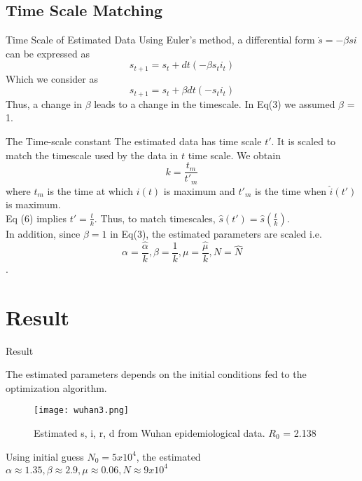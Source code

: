 \documentclass{beamer}
\begin{document}
\subsection{Time Scale Matching}
\begin{frame}{Time Scale of Estimated Data}
Using Euler’s method, a differential form $\dot{s}=-\beta si$ can be expressed as
	$$s_{t+1} = s_t + dt (-\beta s_t i_t)$$
Which we consider as 
	$$s_{t+1} = s_t + \beta dt (- s_t i_t)$$
Thus, a change in $\beta$ leads to a change in the timescale. In Eq(3) we assumed $\beta$ = 1. \\
\end{frame}

\begin{frame}{The Time-scale constant}
The estimated data has time scale $t'$. It is scaled to match the timescale used by the data in $t$ time scale. We obtain 
\begin{equation}k = \frac{t_m}{t'_m} \end{equation} 
where $t_m $ is the time at which $i(t)$ is maximum and  $t'_m$ is the time when $\hat{i}(t')$ is maximum. 
\bigskip
\\
Eq (6) implies $t' = \frac{t}{k}$. Thus, to match timescales, $\hat{s}(t') = \hat{s}(\frac{t}{k}) $. \\ 
In addition, since $\beta = 1$ in Eq(3), the estimated parameters are scaled i.e. 
$$\alpha = \frac{\hat{\alpha}}{k}, \beta = \frac{1}{k}, \mu = \frac{\hat{\mu}}{k}, N = \hat{N}$$.
\end{frame}

\section{Result}
\begin{frame}{Result}

The estimated parameters depends on the initial conditions fed to the optimization algorithm. 

\end{frame}

\begin{frame}
\begin{figure}
  \texttt{[image: wuhan3.png]}
  \caption{Estimated s, i, r, d from Wuhan epidemiological data. $R_0$ = 2.138}
  \label{fig:wuhan3}
\end{figure}
\vspace{-6mm}
Using initial guess $N_0 = 5x10^4$, the estimated $\alpha \approx 1.35 , \beta \approx 2.9, \mu \approx 0.06, N \approx 9x10^4$
\end{frame}
\end{document}
